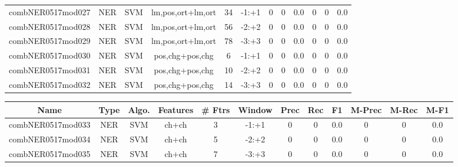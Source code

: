 \documentclass[a4paper]{article}
\begin{document}
\begin{landscape}
\begin{center}
\begin{tabular}{ |c|c|c|c|c|c|c|c|c|c|c|c|}
 
 	
 	\small{ combNER0517mod027 } & NER & SVM & lm,pos,ort+lm,ort  &  34 &  -1:+1  &  0 & 0 & 0.0  &  0 & 0 & 0.0 \\
 	

 
 	
 	\small{ combNER0517mod028 } & NER & SVM & lm,pos,ort+lm,ort  &  56 &  -2:+2  &  0 & 0 & 0.0  &  0 & 0 & 0.0 \\
 	

 
 	
 	\small{ combNER0517mod029 } & NER & SVM & lm,pos,ort+lm,ort  &  78 &  -3:+3  &  0 & 0 & 0.0  &  0 & 0 & 0.0 \\
 	

 
 	
 	\small{ combNER0517mod030 } & NER & SVM & pos,chg+pos,chg  &  6 &  -1:+1  &  0 & 0 & 0.0  &  0 & 0 & 0.0 \\
 	

 
 	
 	\small{ combNER0517mod031 } & NER & SVM & pos,chg+pos,chg  &  10 &  -2:+2  &  0 & 0 & 0.0  &  0 & 0 & 0.0 \\
 	

 
 	
 	\small{ combNER0517mod032 } & NER & SVM & pos,chg+pos,chg  &  14 &  -3:+3  &  0 & 0 & 0.0  &  0 & 0 & 0.0 \\
 	
 \hline
\end{tabular}
\end{center}




\begin{center}
\begin{tabular}{ |c|c|c|c|c|c|c|c|c|c|c|c|} 
 \hline
 	Name & Type & Algo. & Features & \# Ftrs & Window & Prec & Rec & F1 & M-Prec & M-Rec & M-F1\\
 \hline

 	

 
 	
 	\small{ combNER0517mod033 } & NER & SVM & ch+ch  &  3 &  -1:+1  &  0 & 0 & 0.0  &  0 & 0 & 0.0 \\
 	

 
 	
 	\small{ combNER0517mod034 } & NER & SVM & ch+ch  &  5 &  -2:+2  &  0 & 0 & 0.0  &  0 & 0 & 0.0 \\
 	

 
 	
 	\small{ combNER0517mod035 } & NER & SVM & ch+ch  &  7 &  -3:+3  &  0 & 0 & 0.0  &  0 & 0 & 0.0 \\
 	


\end{tabular}
\end{center}
\end{landscape}
\end{document}
